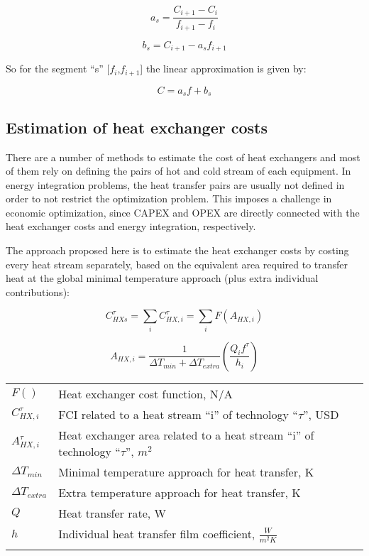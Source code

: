 \documentclass[10pt,twoside,a4paper]{report}
\begin{document}
\begin{equation}
  \label{eq:a}
  a_s=\frac{C_{i+1}-C_i}{f_{i+1}-f_i}
\end{equation}

\begin{equation}
  \label{eq:b}
  b_s=C_{i+1}-a_sf_{i+1}
\end{equation}

So for the segment ``s'' [$f_i$,$f_{i+1}$] the linear approximation
is given by:

\begin{equation}
  \label{eq:linear}
  C = a_sf+b_s
\end{equation}


\subsection{Estimation of heat exchanger costs}

There are a number of methods to estimate the cost of heat exchangers
and most of them rely on defining the pairs of hot and cold stream of
each equipment. In energy integration problems, the heat transfer
pairs are usually not defined in order to not restrict the
optimization problem. This imposes a challenge in economic
optimization, since CAPEX and OPEX are directly connected with the
heat exchanger costs and energy integration, respectively.

The approach proposed here is to estimate the heat exchanger costs by
costing every heat stream separately, based on the equivalent area
required to transfer heat at the global minimal temperature approach
(plus extra individual contributions):

\begin{equation}
  \label{eq:hx_cost}
  C_{HXs}^\tau = \sum_i C_{HX,i}^\tau = \sum_i F(A_{HX,i}) 
\end{equation}

\begin{equation}
  \label{eq:area}
  A_{HX,i} = \frac{1}{\Delta T_{min}+\Delta T_{extra}} \left ( \frac{Q_if^\tau}{h_i} \right )
\end{equation}

\begin{tabular}[h]{ll}
  $F()$ & Heat exchanger cost function, N/A\\
  $C_{HX,i}^\tau$ & FCI related to a heat stream ``i'' of technology ``$\tau$'', USD \\
  $A_{HX,i}^\tau$ & Heat exchanger area related to a heat stream ``i'' of technology ``$\tau$'', $m^2$ \\
  $\Delta T_{min}$ & Minimal temperature approach for heat transfer, K\\
  $\Delta T_{extra}$ & Extra temperature approach for heat transfer, K\\
  $Q$ & Heat transfer rate, W \\
  $h$ & Individual heat transfer film coefficient, $\frac{W}{m^2K}$ \\
  \\
\end{tabular}
\end{document}
